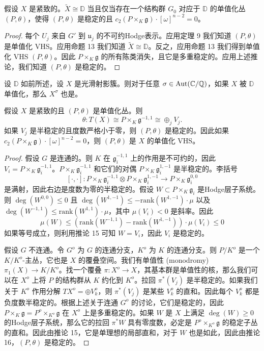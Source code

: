 \begin{theorem}
假设 $X$ 是紧致的。$\tilde{X} \cong \mathbb{D}$ 当且仅当存在一个结构群 $G_0$ 对应于 $\mathbb{D}$ 的单值化丛 $(P, \theta)$，使得 $(P, \theta)$ 是稳定的且 $c_2(P \times_K \mathfrak{g}) \cdot [\omega]^{n-2} = 0$。
\end{theorem}

\begin{proof}
每个 $U_j$ 来自 $G'$ 到 $\mathfrak{u}_j$ 的不可约Hodge表示。应用定理 9 我们知道 $(P, \theta)$ 是单值化 VHS。应用命题 13 我们知道 $\tilde{X} \cong \mathbb{D}$。反之，应用命题 13 我们得到单值化 VHS $(P, \theta)$。因此 $P \times_K \mathfrak{g}$ 的所有陈类消失，且它是多重稳定的。应用上述推论，我们知道 $(P, \theta)$ 是稳定的。
\end{proof}

\begin{corollary}
设 $\mathbb{D}$ 如前所述，设 $X$ 是光滑射影簇。则对于任意 $\sigma \in \operatorname{Aut}(\mathbb{C}/\mathbb{Q})$，如果 $X$ 被 $\mathbb{D}$ 单值化，那么 $X^\sigma$ 也是。
\end{corollary}

\begin{proposition}
假设 $X$ 是紧致的且 $(P, \theta)$ 是单值化丛。则
\[ \theta: T(X) \cong P \times_K \mathfrak{g}^{-1,1} \cong \oplus_j V_j. \]
如果 $V_j$ 是半稳定的且度数严格小于零，则 $(P, \theta)$ 是稳定的。因此如果 $c_2(P \times_K \mathfrak{g}) \cdot [\omega]^{n-2} = 0$，则 $(P, \theta)$ 是 $X$ 的单值化 VHS。
\end{proposition}

\begin{proof}
假设 $G$ 是连通的。则 $K$ 在 $\mathfrak{g}_i^{-1,1}$ 上的作用是不可约的，因此 $V_i = P \times_K \mathfrak{g}_i^{-1,1}$。$P \times_K \mathfrak{g}_i^{-1,1}$ 和它们的对偶 $P \times_K \mathfrak{g}_i^{1,-1}$ 是半稳定的。李括号
\[ [\cdot, \cdot]: P \times_K \mathfrak{g}_i^{-1,1} \otimes P \times_K \mathfrak{g}_i^{1,-1} \to P \times_K \mathfrak{g}_i^{0,0} \]
是满射，因此右边是度数为零的半稳定的。假设 $W \subset P \times_K \mathfrak{g}_i$ 是Hodge层子系统。则 $\deg(W^{0,0}) \le 0$ 且 $\deg(W^{1,-1}) \le -\mathrm{rank}(W^{1,-1}) \cdot \mu$ 以及 $\deg(W^{-1,1}) \le \mathrm{rank}(W^{1,1}) \cdot \mu$，其中 $\mu(V_i) < 0$ 是斜率。因此
\[ \mu(W) \le (\mathrm{rank}(W^{-1,1}) - \mathrm{rank}(W^{1,-1})) \cdot \mu(V_i) \le 0 \]
如果等号成立，则利用推论 15 可知 $W=V_i$，因此 $V_i$ 是稳定的。

假设 $G$ 不连通。令 $G^o$ 为 $G$ 的连通分支，$K^o$ 为 $K$ 的连通分支。则 $P/K^o$ 是一个 $K/K^o$-主丛，它也是 $X$ 的覆叠空间。我们有单值性 (monodromy) $\pi_1(X) \to K/K^o$。找一个覆叠 $\pi: X^o \to X$，其基本群是单值性的核，那么我们可以在 $X^o$ 上将 $P$ 的结构群从 $K$ 约化到 $K^o$。拉回 $\pi^*(V_j)$ 是半稳定的。如果我们关于 $K^o$ 作用分解 $TX^o = \oplus V_k^o$，则 $\pi^*(V_j)$ 是某些 $V_k^o$ 的直和。因此每个 $V_k^o$ 都是负度数半稳定的。根据上述关于连通 $G^o$ 的讨论，它们是稳定的，因此 $P \times_K \mathfrak{g} = P^o \times_{K^o} \mathfrak{g}$ 在 $X^o$ 上是多重稳定的。如果 $W$ 是 $X$ 上满足 $\deg(W) \ge 0$ 的Hodge层子系统，那么它的拉回 $\pi^*W$ 具有零度数，必定是 $P^o \times_{K^o} \mathfrak{g}$ 的稳定子丛的直和。因此由推论 15，它是单理想的局部直和，对于 $W$ 也是如此，因此由推论 16，$(P, \theta)$ 是稳定的。
\end{proof}

